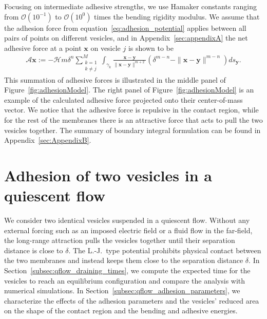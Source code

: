 \documentclass[prf,superscriptaddress,showkeys]{revtex4-1}
\renewcommand{\AA}{\mathcal{A}}
\newcommand{\xx}{\mathbf{x}}
\newcommand{\yy}{\mathbf{y}}
\begin{document}
Focusing on intermediate adhesive strengths, we use Hamaker constants
ranging from $\mathcal{O}(10^{-1})$ to $\mathcal{O}(10^0)$ times the
bending rigidity modulus.  We assume that the adhesion force from
equation~\ref{eq:adhesion_potential} applies between all pairs of points
on different vesicles, and in Appendix~\ref{sec:appendixA} the net
adhesive force at a point $\xx$ on vesicle $j$ is shown to be
\begin{align}
  \AA\xx:=-\mathcal{H} m \delta^{n}\sum_{\substack{k=1 \\ k \neq j}}^M 
  \int_{\gamma_k} \frac{\xx - \yy}{\|\xx - \yy\|^{m+2}} 
  \left(\delta^{m-n} - \|\xx - \yy\|^{m-n} \right) ds_\yy.
  \label{eqn:adhesionForce}
\end{align}
This summation of adhesive forces is illustrated in the middle panel of
Figure~\ref{fig:adhesionModel}.  The right panel of
Figure~\ref{fig:adhesionModel} is an example of the calculated adhesive
force projected onto their center-of-mass vector. We notice that the
adhesive force is repulsive in the contact region, while for the rest of
the membranes there is an attractive force that acts to pull the two
vesicles together. The summary of boundary integral formulation can be
found in Appendix~\ref{sec:AppendixB}.




\section{Adhesion of two vesicles in a quiescent flow} 
\label{sec:qflow} 
We consider two identical vesicles
suspended in a quiescent flow.  Without any external forcing such as an
imposed electric field or a fluid flow in the far-field, the long-range
attraction pulls the vesicles together until their separation distance
is close to $\delta$. The L.-J.~type potential prohibits physical
contact between the two membranes and instead keeps them close to the
separation distance $\delta$.  In
Section~\ref{subsec:qflow_draining_times}, we compute the expected time
for the vesicles to reach an equilibrium configuration and compare the
analysis with numerical simulations.  In
Section~\ref{subsec:qflow_adhesion_parameters}, we characterize the
effects of the adhesion parameters and the vesicles' reduced area on the
shape of the contact region and the bending and adhesive energies.
\end{document}
